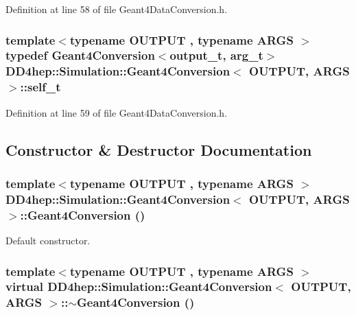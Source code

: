 Definition at line 58 of file Geant4DataConversion.h.\hypertarget{class_d_d4hep_1_1_simulation_1_1_geant4_conversion_ac48f71e223506f7c92f8358299ac5dfe}{
\subsubsection[{self\_\-t}]{\setlength{\rightskip}{0pt plus 5cm}template$<$typename OUTPUT , typename ARGS $>$ typedef {\bf Geant4Conversion}$<${\bf output\_\-t}, {\bf arg\_\-t}$>$ {\bf DD4hep::Simulation::Geant4Conversion}$<$ OUTPUT, ARGS $>$::{\bf self\_\-t}}}
\label{class_d_d4hep_1_1_simulation_1_1_geant4_conversion_ac48f71e223506f7c92f8358299ac5dfe}


Definition at line 59 of file Geant4DataConversion.h.

\subsection{Constructor \& Destructor Documentation}
\hypertarget{class_d_d4hep_1_1_simulation_1_1_geant4_conversion_a1c01751a147e2f8f59c5def99d3b610c}{
\subsubsection[{Geant4Conversion}]{\setlength{\rightskip}{0pt plus 5cm}template$<$typename OUTPUT , typename ARGS $>$ {\bf DD4hep::Simulation::Geant4Conversion}$<$ OUTPUT, ARGS $>$::{\bf Geant4Conversion} ()}}
\label{class_d_d4hep_1_1_simulation_1_1_geant4_conversion_a1c01751a147e2f8f59c5def99d3b610c}


Default constructor. \hypertarget{class_d_d4hep_1_1_simulation_1_1_geant4_conversion_ad45a38e4466edfe39670a783931bdbe6}{
\subsubsection[{$\sim$Geant4Conversion}]{\setlength{\rightskip}{0pt plus 5cm}template$<$typename OUTPUT , typename ARGS $>$ virtual {\bf DD4hep::Simulation::Geant4Conversion}$<$ OUTPUT, ARGS $>$::$\sim${\bf Geant4Conversion} ()}}
\label{class_d_d4hep_1_1_simulation_1_1_geant4_conversion_ad45a38e4466edfe39670a783931bdbe6}


